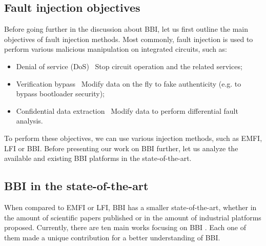 
	\subsection{Fault injection objectives}
		Before going further in the discussion about BBI, let us first outline the main objectives of fault injection methods.
		Most commonly, fault injection is used to perform various malicious manipulation on integrated circuits, such as:
		\begin{itemize}
			\item Denial of service (DoS) \textrightarrow\ Stop circuit operation and the related services;
			\item Verification bypass \textrightarrow\ Modify data on the fly to fake authenticity (e.g. to bypass bootloader security);
			\item Confidential data extraction \textrightarrow\ Modify data to perform differential fault analysis.
		\end{itemize}
		To perform these objectives, we can use various injection methods, such as EMFI, LFI or BBI.
		Before presenting our work on BBI further, let us analyze the available and existing BBI platforms in the state-of-the-art.

	\subsection{BBI in the state-of-the-art}
%
		When compared to EMFI or LFI, BBI has a smaller state-of-the-art, whether in the amount of scientific papers published or in the amount of industrial platforms proposed.
		Currently, there are ten main works focusing on BBI \cite{bbiOrigin, bbiSecond, bbiThird, bbiColin,japbbi, japbbi2, mybbiCosade, mybbiFdtc2022, mybbifdtc2023, colinFdtc2023}.
		Each one of them made a unique contribution for a better understanding of BBI.

